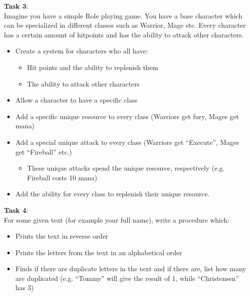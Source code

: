 \textbf{Task 3}:\\
Imagine you have a simple Role playing game. You have a base character which can be specialized in different classes such as Warrior, Mage etc. Every character has a certain amount of hitpoints and has the ability to attack other characters. 
\begin{itemize}
\item Create a system for characters who all have:
\begin{itemize}
\item Hit points and the ability to replenish them
\item The ability to attack other characters
\end{itemize}
\item Allow a character to have a specific class
\item Add a specific unique resource to every class (Warriors get fury, Mages get mana)
\item Add a special unique attack to every class (Warriors get “Execute”, Mages get “Fireball” etc.)
\begin{itemize}
\item These unique attacks spend the unique resource, respectively (e.g. Fireball costs 10 mana) 
\end{itemize}
\item Add the ability for every class to replenish their unique resource.
\end{itemize}

\textbf{Task 4}:\\
For some given text (for example your full name), write a procedure which:
\begin{itemize}
\item Prints the text in reverse order
\item Prints the letters from the text in an alphabetical order
\item Finds if there are duplicate letters in the text and if there are, list how many are duplicated (e.g. “Tommy” will give the result of 1, while “Christensen” has 3) 
\end{itemize}